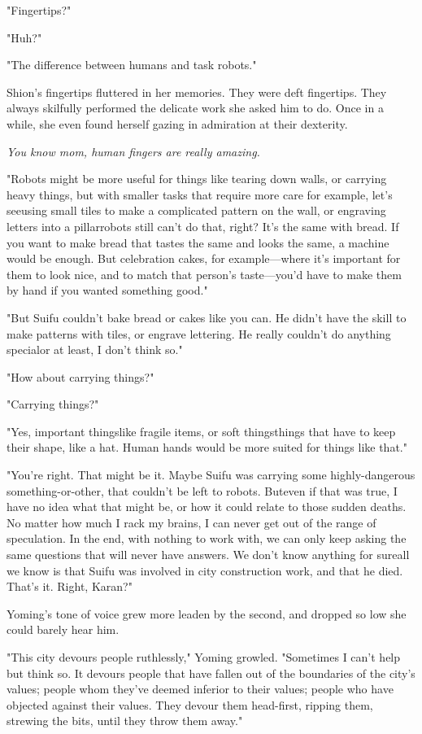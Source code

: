 "Fingertips?"

"Huh?"

"The difference between humans and task robots."

Shion's fingertips fluttered in her memories. They were deft fingertips.
They always skilfully performed the delicate work she asked him to do.
Once in a while, she even found herself gazing in admiration at their
dexterity.

\emph{You know mom, human fingers are really amazing.}

"Robots might be more useful for things like tearing down walls, or
carrying heavy things, but with smaller tasks that require more care\el 
for example, let's see\el using small tiles to make a complicated
pattern on the wall, or engraving letters into a pillar\el robots still
can't do that, right? It's the same with bread. If you want to make
bread that tastes the same and looks the same, a machine would be
enough. But celebration cakes, for example---where it's important for them
to look nice, and to match that person's taste---you'd have to make them
by hand if you wanted something good."

"But Suifu couldn't bake bread or cakes like you can. He didn't have the
skill to make patterns with tiles, or engrave lettering. He really
couldn't do anything special\el or at least, I don't think so."

"How about carrying things?"

"Carrying things?"

"Yes, important things\el like fragile items, or soft things\el things
that have to keep their shape, like a hat. Human hands would be more
suited for things like that."

"You're right. That might be it. Maybe Suifu was carrying some
highly-dangerous something-or-other, that couldn't be left to robots.
But\el even if that was true, I have no idea what that might be, or how
it could relate to those sudden deaths. No matter how much I rack my
brains, I can never get out of the range of speculation. In the end,
with nothing to work with, we can only keep asking the same questions
that will never have answers. We don't know anything for sure\el all we
know is that Suifu was involved in city construction work, and that he
died. That's it. Right, Karan?"

Yoming's tone of voice grew more leaden by the second, and dropped so
low she could barely hear him.

"This city devours people ruthlessly," Yoming growled. "Sometimes I
can't help but think so. It devours people that have fallen out of the
boundaries of the city's values; people whom they've deemed inferior to
their values; people who have objected against their values. They devour
them head-first, ripping them, strewing the bits, until they throw them
away."

